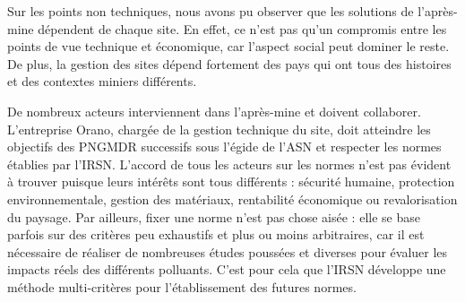 \documentclass{article}
\begin{document}
Sur les points non techniques, nous avons pu observer que les solutions de l'après-mine dépendent de chaque site. En effet, ce n'est pas qu'un compromis entre les points de vue technique et économique, car l'aspect social peut dominer le reste. De plus, la gestion des sites dépend fortement des pays qui ont tous des histoires et des contextes miniers différents.

De nombreux acteurs interviennent dans l'après-mine et doivent collaborer. L'entreprise Orano, chargée de la gestion technique du site, doit atteindre les objectifs des PNGMDR successifs sous l'égide de l'ASN et respecter les normes établies par l'IRSN. L'accord de tous les acteurs sur les normes n'est pas évident à trouver puisque leurs intérêts sont tous différents : sécurité humaine, protection environnementale, gestion des matériaux, rentabilité économique ou revalorisation du paysage. Par ailleurs, fixer une norme n'est pas chose aisée : elle se base parfois sur des critères peu exhaustifs et plus ou moins arbitraires, car il est nécessaire de réaliser de nombreuses études poussées et diverses pour évaluer les impacts réels des différents polluants. C'est pour cela que l'IRSN développe une méthode multi-critères pour l'établissement des futures normes.

\end{document}
